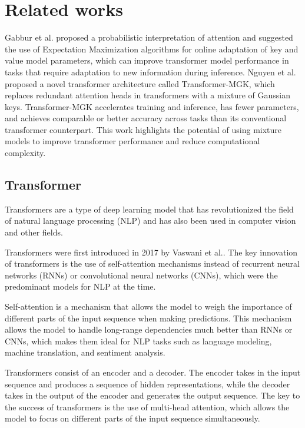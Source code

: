 \section{Related works}
\label{relatedwork}
Gabbur et al. \cite{DBLP:journals/corr/abs-2010-15583} proposed a probabilistic interpretation of attention and suggested the use of Expectation Maximization algorithms for online adaptation of key and value model parameters, which can improve transformer model performance in tasks that require adaptation to new information during inference. Nguyen et al. \cite{DBLP:journals/corr/abs-2110-08678,} proposed a novel transformer architecture called Transformer-MGK, which replaces redundant attention heads in transformers with a mixture of Gaussian keys. Transformer-MGK accelerates training and inference, has fewer parameters, and achieves comparable or better accuracy across tasks than its conventional transformer counterpart. This work highlights the potential of using mixture models to improve transformer performance and reduce computational complexity. 

\subsection{Transformer}
Transformers are a type of deep learning model that has revolutionized the field of natural language processing (NLP) and has also been used in computer vision and other fields.

Transformers were first introduced in 2017 by Vaswani et al.\cite{DBLP:journals/corr/VaswaniSPUJGKP17}. The key innovation of transformers is the use of self-attention mechanisms instead of recurrent neural networks (RNNs) or convolutional neural networks (CNNs), which were the predominant models for NLP at the time.

Self-attention is a mechanism that allows the model to weigh the importance of different parts of the input sequence when making predictions. This mechanism allows the model to handle long-range dependencies much better than RNNs or CNNs, which makes them ideal for NLP tasks such as language modeling, machine translation, and sentiment analysis.

Transformers consist of an encoder and a decoder. The encoder takes in the input sequence and produces a sequence of hidden representations, while the decoder takes in the output of the encoder and generates the output sequence. The key to the success of transformers is the use of multi-head attention, which allows the model to focus on different parts of the input sequence simultaneously.

